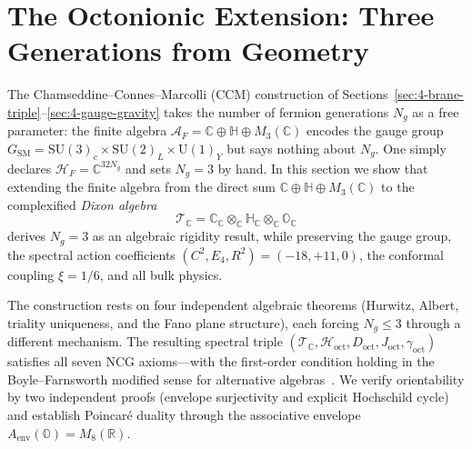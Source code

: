 
\section{The Octonionic Extension: Three Generations from Geometry}
\label{sec:4-octonionic}

The Chamseddine--Connes--Marcolli (CCM) construction of Sections~\ref{sec:4-brane-triple}--\ref{sec:4-gauge-gravity} takes the number of fermion generations $N_g$ as a free parameter: the finite algebra $\mathcal{A}_F = \mathbb{C} \oplus \mathbb{H} \oplus M_3(\mathbb{C})$ encodes the gauge group $G_{\mathrm{SM}} = \mathrm{SU}(3)_c \times \mathrm{SU}(2)_L \times \mathrm{U}(1)_Y$ but says nothing about $N_g$. One simply declares $\mathcal{H}_F = \mathbb{C}^{32 N_g}$ and sets $N_g = 3$ by hand. In this section we show that extending the finite algebra from the direct sum $\mathbb{C} \oplus \mathbb{H} \oplus M_3(\mathbb{C})$ to the complexified \emph{Dixon algebra}
\begin{equation}
  \mathcal{T}_{\mathbb{C}} = \mathbb{C}_{\mathbb{C}} \otimes_{\mathbb{C}} \mathbb{H}_{\mathbb{C}} \otimes_{\mathbb{C}} \mathbb{O}_{\mathbb{C}}
  \label{eq:4-74}
\end{equation}
derives $N_g = 3$ as an algebraic rigidity result, while preserving the gauge group, the spectral action coefficients $(C^2, E_4, R^2) = (-18, +11, 0)$, the conformal coupling $\xi = 1/6$, and all bulk physics.

The construction rests on four independent algebraic theorems (Hurwitz, Albert, triality uniqueness, and the Fano plane structure), each forcing $N_g \leq 3$ through a different mechanism. The resulting spectral triple $(\mathcal{T}_{\mathbb{C}}, \mathcal{H}_{\mathrm{oct}}, D_{\mathrm{oct}}, J_{\mathrm{oct}}, \gamma_{\mathrm{oct}})$ satisfies all seven NCG axioms---with the first-order condition holding in the Boyle--Farnsworth modified sense for alternative algebras~\cite{ch4:BoyleFarnsworth2020}. We verify orientability by two independent proofs (envelope surjectivity and explicit Hochschild cycle) and establish Poincar\'{e} duality through the associative envelope $A_{\mathrm{env}}(\mathbb{O}) = M_8(\mathbb{R})$.

